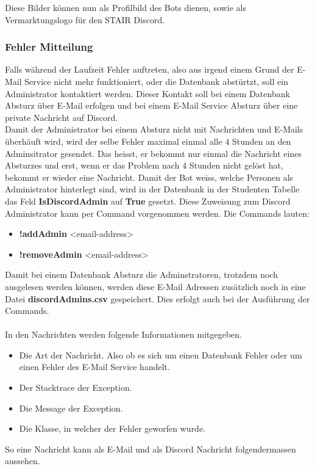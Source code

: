 \documentclass[a4paper, table]{article}
\begin{document}
Diese Bilder können nun als Profilbild des Bots dienen, sowie als Vermarktungslogo für den STAIR Discord.

\subsubsection{Fehler Mitteilung}
Falls während der Laufzeit Fehler auftreten, also aus irgend einem Grund der E-Mail Service nicht mehr funktioniert, 
oder die Datenbank abstürtzt, soll ein Administrator kontaktiert werden.
Dieser Kontakt soll bei einem Datenbank Absturz über E-Mail erfolgen und bei einem E-Mail Service Absturz über eine private Nachricht auf Discord.\\
Damit der Administrator bei einem Absturz nicht mit Nachrichten und E-Mails überhäuft wird, 
wird der selbe Fehler maximal einmal alle 4 Stunden an den Adminsitrator gesendet.
Das heisst, er bekommt nur einmal die Nachricht eines Absturzes und erst, wenn er das Problem nach 4 Stunden nicht gelöst hat, 
bekommt er wieder eine Nachricht.
\newpage
Damit der Bot weiss, welche Personen als Administrator hinterlegt sind, 
wird in der Datenbank in der Studenten Tabelle das Feld \textbf{IsDiscordAdmin} auf \textbf{True} gesetzt.
Diese Zuweisung zum Discord Administrator kann per Command vorgenommen werden.
Die Commands lauten:
\begin{itemize}
    \item \textbf{!addAdmin} <email-address>
    \item \textbf{!removeAdmin} <email-address>
\end{itemize}
Damit bei einem Datenbank Absturz die Adminstratoren, trotzdem noch ausgelesen werden können, 
werden diese E-Mail Adressen zusätzlich noch in eine Datei \textbf{discordAdmins.csv} gespeichert.
Dies erfolgt auch bei der Ausführung der Commands.\\\\
In den Nachrichten werden folgende Informationen mitgegeben.
\begin{itemize}
    \item Die Art der Nachricht. Also ob es sich um einen Datenbank Fehler oder um einen Fehler des E-Mail Service handelt.
    \item Der Stacktrace der Exception.
    \item Die Message der Exception.
    \item Die Klasse, in welcher der Fehler geworfen wurde.
\end{itemize}
So eine Nachricht kann als E-Mail und als Discord Nachricht folgendermassen aussehen.
\end{document}

